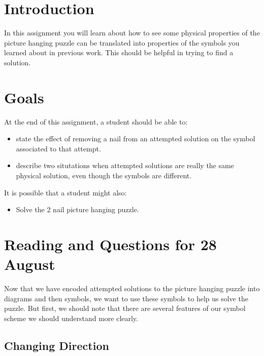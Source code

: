 \documentclass[12pt,letterpaper]{article}
\theoremstyle{definition}
\begin{document}
\setlength{\parskip}{1ex plus 0.5ex minus 0.2ex}
\setlength{\parindent}{0pt}

\pagestyle{fancy}
\cfoot{} 

\section*{Introduction}
In this assignment you will learn about how to see some physical properties of the picture hanging puzzle can be translated into properties of the symbols you learned about in previous work.
This should be helpful in trying to find a solution.

\section*{Goals}
At the end of this assignment, a student should be able to:
\begin{itemize}
\item state the effect of removing a nail from an attempted solution on the symbol associated to that attempt.
\item describe two situtations when attempted solutions are really the same physical solution, even though the symbols are different.
\end{itemize}
It is possible that a student might also:
\begin{itemize}
\item Solve the 2 nail picture hanging puzzle.
\end{itemize}

\section*{Reading and Questions for 28 August}

Now that we have encoded attempted solutions to the picture hanging puzzle into diagrams and then symbols, we want to use these symbols to help us solve the puzzle.
But first, we should note that there are several features of our symbol scheme we should understand more clearly.

\subsection*{Changing Direction}
\end{document}
